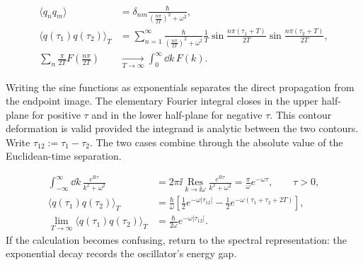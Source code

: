 \begin{align}
  \langle q_nq_m\rangle
  &=\delta_{nm}\frac{\hbar}{\left(\frac{n\pi}{2T}\right)^2+\omega^2},
  \label{eq:253a-ch02-mode-covariance}\\
  \langle q(\tau_1)q(\tau_2)\rangle_T
  &=\sum_{n=1}^{\infty}
  \frac{\hbar}{\left(\frac{n\pi}{2T}\right)^2+\omega^2}
  \frac1T
  \sin\frac{n\pi(\tau_1+T)}{2T}
  \sin\frac{n\pi(\tau_2+T)}{2T},
  \label{eq:253a-ch02-finite-interval-covariance}\\
  \sum_n\frac{\pi}{2T}F\!\left(\frac{n\pi}{2T}\right)
  &\xrightarrow[T\to\infty]{}\int_0^\infty \dd k\,F(k).
  \label{eq:253a-ch02-sum-to-integral}
\end{align}

Writing the sine functions as exponentials separates the direct propagation from the endpoint image. The elementary Fourier integral closes in the upper half-plane for positive $\tau$ and in the lower half-plane for negative $\tau$. This contour deformation is valid provided the integrand is analytic between the two contours. Write $\tau_{12}:=\tau_1-\tau_2$. The two cases combine through the absolute value of the Euclidean-time separation.

\begin{align}
  \int_{-\infty}^{\infty}\dd k\,\frac{e^{\ii k\tau}}{k^2+\omega^2}
  &=2\pi \ii\underset{k\to \ii\omega}{\operatorname{Res}}
  \frac{e^{\ii k\tau}}{k^2+\omega^2}
  =\frac{\pi}{\omega}e^{-\omega\tau},
  \qquad \tau>0,
  \label{eq:253a-ch02-positive-time-residue}\\
  \langle q(\tau_1)q(\tau_2)\rangle_T
  &=\frac{\hbar}{\omega}\left[
  \frac12e^{-\omega|\tau_{12}|}
  -\frac12e^{-\omega(\tau_1+\tau_2+2T)}\right],
  \label{eq:253a-ch02-finite-T-propagator}\\
  \lim_{T\to\infty}\langle q(\tau_1)q(\tau_2)\rangle_T
  &=\frac{\hbar}{2\omega}e^{-\omega|\tau_{12}|}.
  \label{eq:253a-ch02-oscillator-propagator}
\end{align}
If the calculation becomes confusing, return to the spectral representation: the exponential decay records the oscillator's energy gap.

